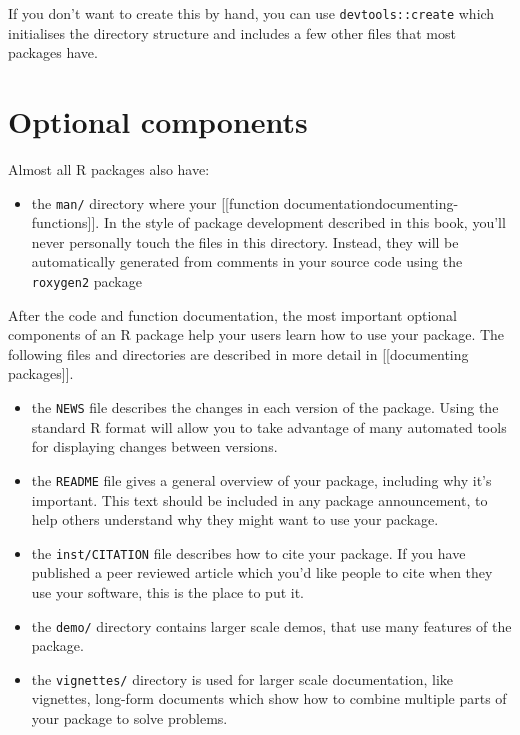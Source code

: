 If you don't want to create this by hand, you can use
\texttt{devtools::create} which initialises the directory structure and
includes a few other files that most packages have.

\section{Optional components}

Almost all R packages also have:

\begin{itemize}
\itemsep1pt\parskip0pt
\item
  the \texttt{man/} directory where your {[}{[}function
  documentation\textbar{}documenting-functions{]}{]}. In the style of
  package development described in this book, you'll never personally
  touch the files in this directory. Instead, they will be automatically
  generated from comments in your source code using the
  \texttt{roxygen2} package
\end{itemize}

After the code and function documentation, the most important optional
components of an R package help your users learn how to use your
package. The following files and directories are described in more
detail in {[}{[}documenting packages{]}{]}.

\begin{itemize}
\item
  the \texttt{NEWS} file describes the changes in each version of the
  package. Using the standard R format will allow you to take advantage
  of many automated tools for displaying changes between versions.
\item
  the \texttt{README} file gives a general overview of your package,
  including why it's important. This text should be included in any
  package announcement, to help others understand why they might want to
  use your package.
\item
  the \texttt{inst/CITATION} file describes how to cite your package. If
  you have published a peer reviewed article which you'd like people to
  cite when they use your software, this is the place to put it.
\item
  the \texttt{demo/} directory contains larger scale demos, that use
  many features of the package.
\item
  the \texttt{vignettes/} directory is used for larger scale
  documentation, like vignettes, long-form documents which show how to
  combine multiple parts of your package to solve problems.
\end{itemize}

